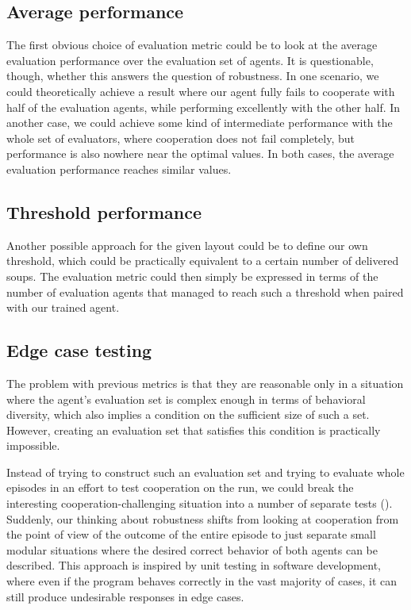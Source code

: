 \subsection{Average performance}

The first obvious choice of evaluation metric could be to look at the average evaluation performance over the evaluation set of agents.
It is questionable, though, whether this answers the question of robustness.
In one scenario, we could theoretically achieve a result where our agent fully fails to cooperate with half of the evaluation agents, while performing excellently with the other half.
In another case, we could achieve some kind of intermediate performance with the whole set of evaluators, where cooperation does not fail completely, but performance is also nowhere near the optimal values.
In both cases, the average evaluation performance reaches similar values. 

\subsection{Threshold performance}

Another possible approach for the given layout could be to define our own threshold, which could be practically equivalent to a certain number of delivered soups.
The evaluation metric could then simply be expressed in terms of the number of evaluation agents that managed to reach such a threshold when paired with our trained agent.

\subsection{Edge case testing}
The problem with previous metrics is that they are reasonable only in a situation where the agent's evaluation set is complex enough in terms of behavioral diversity, which also implies a condition on the sufficient size of such a set. 
However, creating an evaluation set that satisfies this condition is practically impossible.

Instead of trying to construct such an evaluation set and trying to evaluate whole episodes in an effort to test cooperation on the run, we could break the interesting cooperation-challenging situation into a number of separate tests (\cite{knott2021evaluating}).
Suddenly, our thinking about robustness shifts from looking at cooperation from the point of view of the outcome of the entire episode to just separate small modular situations where the desired correct behavior of both agents can be described.
This approach is inspired by unit testing in software development, where even if the program behaves correctly in the vast majority of cases, it can still produce undesirable responses in edge cases.



